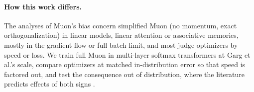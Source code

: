 \paragraph{How this work differs.} The analyses of Muon's bias concern simplified Muon (no momentum, exact orthogonalization) in linear models, linear attention or associative memories, mostly in the gradient-flow or full-batch limit, and most judge optimizers by speed or loss. We train full Muon in multi-layer softmax transformers at Garg et al.'s scale, compare optimizers at matched in-distribution error so that speed is factored out, and test the consequence out of distribution, where the literature predicts effects of both signs \citep{vasudeva2025,wang2025muon,dragutinovic2026}.
